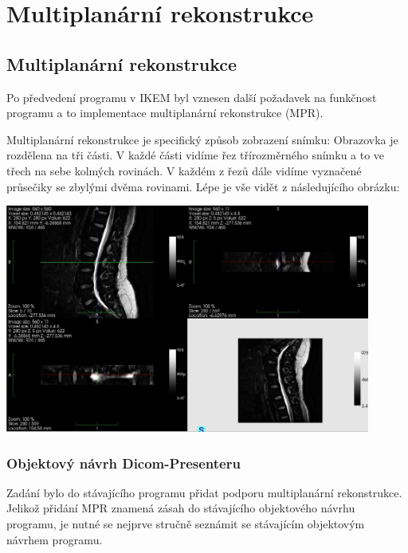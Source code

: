 \newpage
\chapter{Multiplanární rekonstrukce}
\section{Multiplanární rekonstrukce}
Po předvedení programu v IKEM byl vznesen další požadavek na funkčnost programu a to implementace multiplanární rekonstrukce (MPR).

Multiplanární rekonstrukce je specifický způsob zobrazení snímku: Obrazovka je rozdělena na tři části. V každé části vidíme řez třírozměrného snímku a to ve třech na sebe kolmých rovinách. V každém z řezů dále vidíme vyznačené průsečiky se zbylými dvěma rovinami. Lépe je vše vidět z následujícího obrázku:

\includegraphics[width=0.9\textwidth,height=0.9\textwidth]{Text/IMG/MPR_Medinria.jpg}

\subsection{Objektový návrh Dicom-Presenteru}
Zadání bylo do stávajícího programu přidat podporu multiplanární rekonstrukce. Jelikož přidání MPR znamená zásah do stávajícího objektového návrhu programu, je nutné se nejprve stručně seznámit se stávajícím objektovým návrhem programu.


